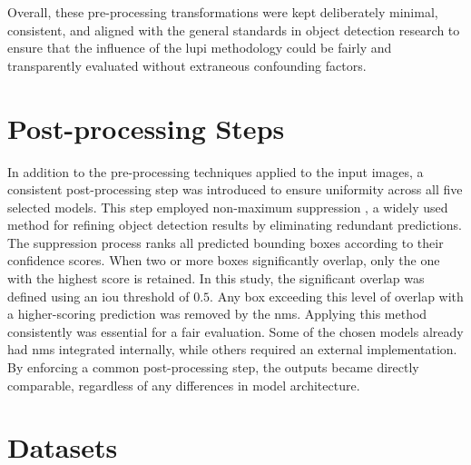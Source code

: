 Overall, these pre-processing transformations were kept deliberately minimal, consistent, and aligned with the general standards in object detection research to ensure that the influence of the \gls{lupi} methodology could be fairly and transparently evaluated without extraneous confounding factors.

\section{Post-processing Steps}
\label{sec:4_postprocessing}

In addition to the pre-processing techniques applied to the input images, a consistent post-processing step was introduced to ensure uniformity across all five selected models. This step employed non-maximum suppression \cite{nms}, a widely used method for refining object detection results by eliminating redundant predictions.
The suppression process ranks all predicted bounding boxes according to their confidence scores. When two or more boxes significantly overlap, only the one with the highest score is retained. In this study, the significant overlap was defined using an \gls{iou} threshold of $0.5$. Any box exceeding this level of overlap with a higher-scoring prediction was removed by the \gls{nms}.
Applying this method consistently was essential for a fair evaluation. Some of the chosen models already had \gls{nms} integrated internally, while others required an external implementation. By enforcing a common post-processing step, the outputs became directly comparable, regardless of any differences in model architecture.

\section{Datasets}
\label{sec:4_datasets}

